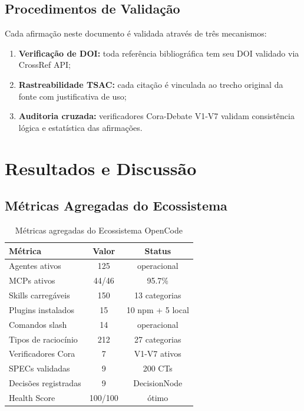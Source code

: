 \documentclass[12pt,a4paper,sumario=tradicional]{abntex2}
\begin{document}
\section{Procedimentos de Validação}

Cada afirmação neste documento é validada através de três mecanismos:

\begin{enumerate}
    \item \textbf{Verificação de DOI:} toda referência bibliográfica tem seu DOI validado via CrossRef API;
    \item \textbf{Rastreabilidade TSAC:} cada citação é vinculada ao trecho original da fonte com justificativa de uso;
    \item \textbf{Auditoria cruzada:} verificadores Cora-Debate V1-V7 validam consistência lógica e estatística das afirmações.
\end{enumerate}

\chapter{Resultados e Discussão}

\section{Métricas Agregadas do Ecossistema}

\begin{table}[H]
\centering
\caption{Métricas agregadas do Ecossistema OpenCode}
\label{tab:metrics}
\begin{tabular}{@{}lcc@{}}
\toprule
\textbf{Métrica} & \textbf{Valor} & \textbf{Status} \\
\midrule
Agentes ativos      & 125 & operacional \\
MCPs ativos         & 44/46 & 95.7\% \\
Skills carregáveis  & 150 & 13 categorias \\
Plugins instalados  & 15 & 10 npm + 5 local \\
Comandos slash      & 14 & operacional \\
Tipos de raciocínio & 212 & 27 categorias \\
Verificadores Cora  & 7 & V1-V7 ativos \\
SPECs validadas     & 9 & 200 CTs \\
Decisões registradas & 9 & DecisionNode \\
Health Score        & 100/100 & ótimo \\
\bottomrule
\end{tabular}
\end{table}
\end{document}
